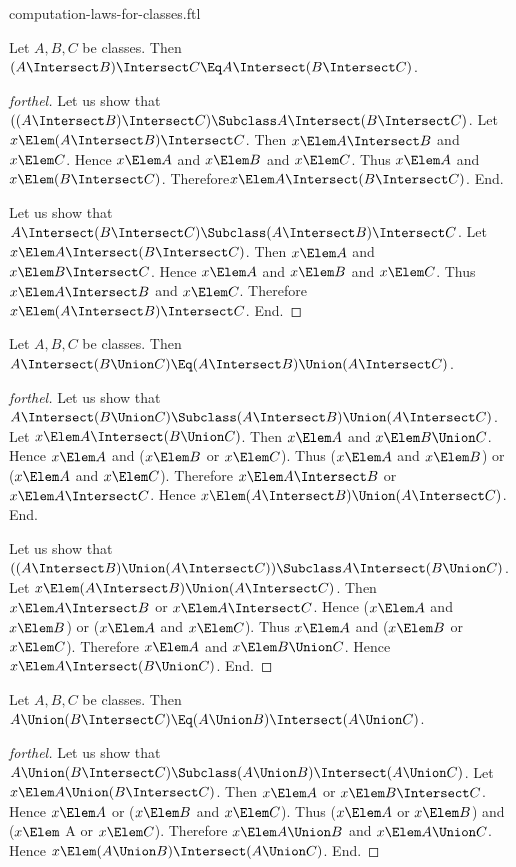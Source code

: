 \documentclass{stex}
\begin{document}
\begin{smodule}{computation-laws-for-classes.ftl}
\begin{proposition*}[forthel]
  Let $A, B, C$ be classes.
  Then $(A \Intersect B) \Intersect C \Eq A \Intersect (B \Intersect C)$.
\end{proposition*}
\begin{proof}[forthel]
  Let us show that $((A \Intersect B) \Intersect C) \Subclass A \Intersect (B \Intersect C)$. %
    Let $x \Elem (A \Intersect B) \Intersect C$.
    Then $x \Elem A \Intersect B$ and $x \Elem C$.
    Hence $x \Elem A$ and $x \Elem B$ and $x \Elem C$.
    Thus $x \Elem A$ and $x \Elem (B \Intersect C)$.
    Therefore$ x \Elem A \Intersect (B \Intersect C)$.
  End.

  Let us show that $A \Intersect (B \Intersect C) \Subclass (A \Intersect B) \Intersect C$.
    Let $x \Elem A \Intersect (B \Intersect C)$.
    Then $x \Elem A$ and $x \Elem B \Intersect C$.
    Hence $x \Elem A$ and $x \Elem B$ and $x \Elem C$.
    Thus $x \Elem A \Intersect B$ and $x \Elem C$.
    Therefore $x \Elem (A \Intersect B) \Intersect C$.
  End.
\end{proof}

\begin{proposition*}[forthel]
  Let $A, B, C$ be classes.
  Then $A \Intersect (B \Union C) \Eq (A \Intersect B) \Union (A \Intersect C)$.
\end{proposition*}
\begin{proof}[forthel]
  Let us show that $A \Intersect (B \Union C) \Subclass (A \Intersect B) \Union (A \Intersect C)$.
    Let $x \Elem A \Intersect (B \Union C)$.
    Then $x \Elem A$ and $x \Elem B \Union C$.
    Hence $x \Elem A$ and ($x \Elem B$ or $x \Elem C$).
    Thus ($x \Elem A$ and $x \Elem B$) or ($x \Elem A$ and $x \Elem C$).
    Therefore $x \Elem A \Intersect B$ or $x \Elem A \Intersect C$.
    Hence $x \Elem (A \Intersect B) \Union (A \Intersect C)$.
  End.

  Let us show that $((A \Intersect B) \Union (A \Intersect C)) \Subclass A \Intersect (B \Union C)$. %
    Let $x \Elem (A \Intersect B) \Union (A \Intersect C)$.
    Then $x \Elem A \Intersect B$ or $x \Elem A \Intersect C$.
    Hence ($x \Elem A$ and $x \Elem B$) or ($x \Elem A$ and $x \Elem C$).
    Thus $x \Elem A$ and ($x \Elem B$ or $x \Elem C$).
    Therefore $x \Elem A$ and $x \Elem B \Union C$.
    Hence$ x \Elem A \Intersect (B \Union C)$.
  End.
\end{proof}

\begin{proposition*}[forthel]
  Let $A, B, C$ be classes.
  Then $A \Union (B \Intersect C) \Eq (A \Union B) \Intersect (A \Union C)$.
\end{proposition*}
\begin{proof}[forthel]
  Let us show that $A \Union (B \Intersect C) \Subclass (A \Union B) \Intersect (A \Union C)$.
    Let $x \Elem A \Union (B \Intersect C)$.
    Then $x \Elem A$ or $x \Elem B \Intersect C$.
    Hence $x \Elem A$ or ($x \Elem B$ and $x \Elem C$).
    Thus ($x \Elem A$ or $x \Elem B$) and ($x \Elem$ A or $x \Elem C$).
    Therefore $x \Elem A \Union B$ and $x \Elem A \Union C$.
    Hence $x \Elem (A \Union B) \Intersect (A \Union C)$.
  End.


\end{proof}
\end{smodule}
\end{document}
